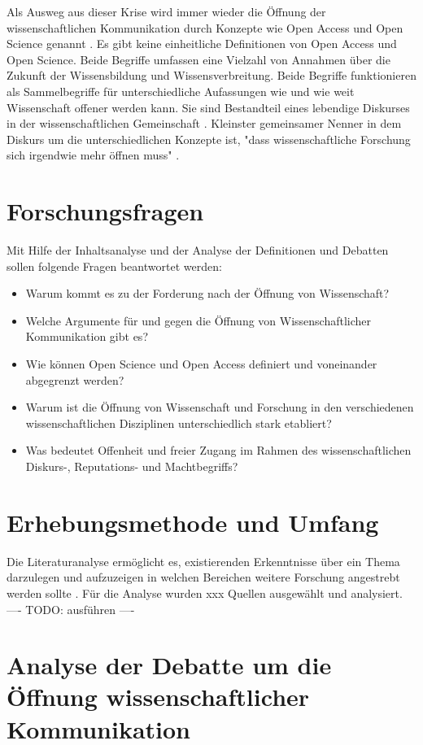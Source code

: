 Als Ausweg aus dieser Krise wird immer wieder die Öffnung der wissenschaftlichen Kommunikation durch Konzepte wie Open Access und Open Science genannt \cite{suchen}. Es gibt keine einheitliche Definitionen von Open Access und Open Science. Beide Begriffe umfassen eine Vielzahl von Annahmen über die Zukunft der Wissensbildung und Wissensverbreitung. Beide Begriffe funktionieren als Sammelbegriffe für unterschiedliche Aufassungen wie und wie weit Wissenschaft offener werden kann. Sie sind Bestandteil eines lebendige Diskurses in der wissenschaftlichen Gemeinschaft \cite{schulze_2013_open}. Kleinster gemeinsamer Nenner in dem Diskurs um die unterschiedlichen Konzepte ist, "dass wissenschaftliche Forschung sich irgendwie mehr öffnen muss" \cite{cite:9}.

\section{Forschungsfragen}

Mit Hilfe der Inhaltsanalyse und der Analyse der Definitionen und Debatten sollen folgende Fragen beantwortet werden:
\begin{itemize}
\item Warum kommt es zu der Forderung nach der Öffnung von Wissenschaft?
\item Welche Argumente für und gegen die Öffnung von Wissenschaftlicher Kommunikation gibt es?
\item Wie können Open Science und Open Access definiert und voneinander abgegrenzt werden?
\item Warum ist die Öffnung von Wissenschaft und Forschung in den verschiedenen wissenschaftlichen Disziplinen unterschiedlich stark etabliert?
\item Was bedeutet Offenheit und freier Zugang im Rahmen des wissenschaftlichen Diskurs-, Reputations- und Machtbegriffs?
\end{itemize}

\section{Erhebungsmethode und Umfang}

Die Literaturanalyse ermöglicht es, existierenden Erkenntnisse über ein Thema darzulegen und aufzuzeigen in welchen Bereichen weitere Forschung angestrebt werden sollte \cite{webster2002analyzing}. Für die Analyse wurden xxx Quellen ausgewählt und analysiert. ---- TODO: ausführen ----

\section{Analyse der Debatte um die Öffnung wissenschaftlicher Kommunikation}

